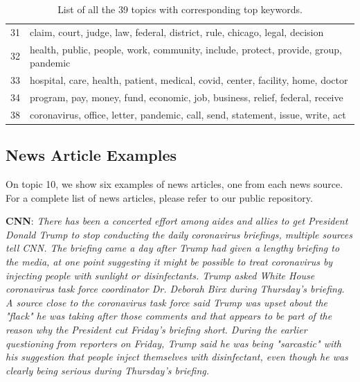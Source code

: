 \documentclass[11pt]{article}
\begin{document}
\begin{table}[ht]
\begin{small}
\begin{tabular}{c|l}
31          & claim, court, judge, law, federal, district, rule, chicago, legal, decision                             \\
32          & health, public, people, work, community, include, protect, provide, group, pandemic                     \\
33          & hospital, care, health, patient, medical, covid, center, facility, home, doctor                         \\
34          & program, pay, money, fund, economic, job, business, relief, federal, receive                            \\
38          & coronavirus, office, letter, pandemic, call, send, statement, issue, write, act                        
\end{tabular}
\end{small}
\caption{List of all the 39 topics with corresponding top keywords.}
\label{tab:all-topics}
\end{table}


\subsection{News Article Examples}
On topic 10, we show six examples of news articles, one from each news source. For a complete list of news articles, please refer to our public repository.

\textbf{CNN}: \emph{There has been a concerted effort among aides and allies to get President Donald Trump to stop conducting the daily coronavirus briefings, multiple sources tell CNN. The briefing came a day after Trump had given a lengthy briefing to the media, at one point suggesting it might be possible to treat coronavirus by injecting people with sunlight or disinfectants. Trump asked White House coronavirus task force coordinator Dr. Deborah Birx during Thursday's briefing. A source close to the coronavirus task force said Trump was upset about the "flack" he was taking after those comments and that appears to be part of the reason why the President cut Friday's briefing short. During the earlier questioning from reporters on Friday, Trump said he was being "sarcastic" with his suggestion that people inject themselves with disinfectant, even though he was clearly being serious during Thursday's briefing.}
\end{document}
